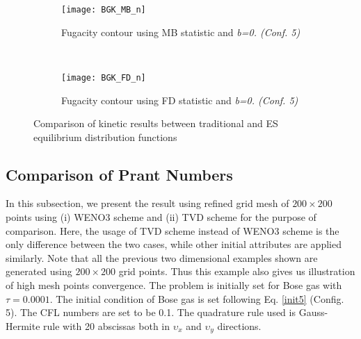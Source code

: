 \documentclass{rsproca}%
\begin{document}
\begin{figure}
        \begin{subfigure}[b]{0.32\textwidth}
                \centering
                \texttt{[image: BGK\_MB\_n]}
                \caption{Fugacity contour using MB statistic and \it{b=0}. (Conf. 5)}
                \label{fig:BGK_MB_n}
        \end{subfigure}
        ~ %
        \begin{subfigure}[b]{0.32\textwidth}
                \centering
                \texttt{[image: BGK\_FD\_n]}
                \caption{Fugacity contour using FD statistic and \it{b=0}. (Conf. 5)}
                \label{fig:BGK_FD_n}
        \end{subfigure}
        \caption{Comparison of kinetic results between traditional and ES equilibrium distribution functions}\label{fig:compare_feq}
\end{figure}

\subsection{Comparison of Prant Numbers}
In this subsection, we present the result using refined grid mesh of $200 \times 200$ points using (i) WENO3 scheme and (ii) TVD scheme for the purpose of comparison. Here, the usage of TVD scheme instead of WENO3 scheme is the only difference between the two cases, while other initial attributes are applied similarly. Note that all the previous two dimensional examples shown are generated using $200 \times 200$ grid points. Thus this example also gives us illustration of high mesh points convergence. The problem is initially set for Bose gas with $\tau = 0.0001$. The initial condition of Bose gas is set following Eq. \ref{init5} (Config. 5). The CFL numbers are set to be 0.1. The quadrature rule used is Gauss-Hermite rule with 20 abscissas both in $\upsilon_x$ and $\upsilon_y$ directions.
\end{document}
